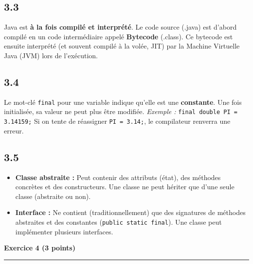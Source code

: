 \documentclass[11pt, a4paper]{article}
\begin{document}
\subsection*{3.3 }
Java est \textbf{à la fois compilé et interprété}. Le code source (.java) est d'abord compilé en un code intermédiaire appelé \textbf{Bytecode} (.class). Ce bytecode est ensuite interprété (et souvent compilé à la volée, JIT) par la Machine Virtuelle Java (JVM) lors de l'exécution.

\subsection*{3.4 }
Le mot-clé \texttt{final} pour une variable indique qu'elle est une \textbf{constante}. Une fois initialisée, sa valeur ne peut plus être modifiée.
\textit{Exemple :} \texttt{final double PI = 3.14159;} Si on tente de réassigner \texttt{PI = 3.14;}, le compilateur renverra une erreur.

\subsection*{3.5 }
\begin{itemize}
    \item \textbf{Classe abstraite :} Peut contenir des attributs (état), des méthodes concrètes et des constructeurs. Une classe ne peut hériter que d'une seule classe (abstraite ou non).
    \item \textbf{Interface :} Ne contient (traditionnellement) que des signatures de méthodes abstraites et des constantes (\texttt{public static final}). Une classe peut implémenter plusieurs interfaces.
\end{itemize}

\begin{center}
    \textbf{\Large Exercice 4 (3 points)}
\end{center}
\vspace{-0.2cm}
\hrule
\vspace{0.3cm}
\end{document}
